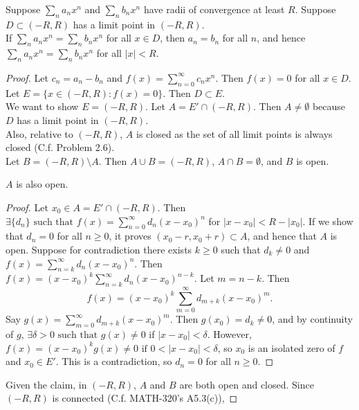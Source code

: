 \begin{thm}
	Suppose $\sum_{n}{a_{n}x^{n}}$ and $\sum_{n}{b_{n}x^{n}}$ have radii of convergence at least  $R$. Suppose $D \subset (-R,R)$ has a limit point in $(-R,R)$.\\
	If $\sum_{n}{a_{n}x^{n}}=\sum_{n}{b_{n}x^{n}}$ for all $x \in D$, then $a_{n}=b_{n}$ for all $n$, and hence $\sum_{n}{a_{n}x^{n}}=\sum_{n}{b_{n}x^{n}}$ for all $\left|x\right|<R$.
	\begin{proof}
		Let $c_{n}=a_{n}-b_{n}$ and $f(x)=\sum_{n=0}^{\infty}{c_n x^{n}}$.
		Then $f(x)=0$ for all $x \in D$.\\
		Let $E=\{x \in (-R,R): f(x)=0\}$. Then $D \subset E$.\\
		We want to show $E=(-R,R)$.
		Let $A=E' \cap (-R,R)$. Then $A\neq \emptyset$ because $D$ has a limit point in $(-R,R)$.\\
		Also, relative to $(-R,R)$, $A$ is closed as the set of all limit points is always closed (C.f. Problem 2.6).\\
		Let $B=(-R,R)\setminus A$. Then $A\cup B=(-R,R)$, $A\cap B=\emptyset$, and $B$ is open.\\
		\begin{claim}
			$A$ is also open.
			\begin{proof}
				Let $x_{0} \in A=E' \cap (-R,R)$.
				Then $\exists{\{ {d}_{n}\}} \text{ such that } f(x)=\sum_{n=0}^{\infty}{d_n (x-x_{0})}^{n}$ for $\left|x-x_{0}\right|<R-\left|x_{0}\right|$.
				If we show that $d_{n}=0$ for all $n\ge 0$, it proves $(x_{0}-r,x_{0}+r) \subset A$, and hence that $A$ is open.
				Suppose for contradiction there exists $k\ge 0$ such that $d_k\neq 0$ and $f(x)=\sum_{n=k}^{\infty}{d_n (x-x_{0})^{n}}$.
				Then $f(x)=(x-x_{0})^{k} \sum_{n=k}^{\infty}{d_n(x-x_{0})^{n-k}}$.
				Let $m=n-k$. Then \[
					f(x)=(x-x_{0})^{k} \sum_{m=0}^{\infty}{d_{m+k}(x-x_{0})^{m}}
					.\]
				Say $g(x)=\sum_{m=0}^{\infty}{d_{m+k}(x-x_{0})^{m}}$. Then
				$g(x_0)=d_k\neq 0$, and by continuity of $g$, $\exists{\delta>0} \text{ such that } g(x)\neq 0$ if $\left|x-x_{0}\right|<\delta$.
				However, $f(x)=(x-x_{0})^{k}g(x)\neq 0	 \text{ if } 0<\left|x-x_{0}\right|<\delta$, so $x_{0}$ is an isolated zero of $f$ and $x_{0} \in E'$.
				This is a contradiction, so $d_{n}=0$ for all $n\ge 0$.
			\end{proof}
		\end{claim}
		Given the claim, in $(-R,R)$, $A$ and $B$ are both open and closed.
		Since $(-R,R)$ is connected (C.f. MATH-320's A5.3(c)),

\end{proof}
\end{thm}
